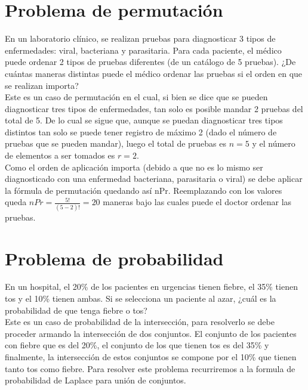 \documentclass[12pt]{article}
\begin{document}
\section{Problema de permutación}

En un laboratorio clínico, se realizan pruebas para diagnosticar 3 tipos de enfermedades: viral, bacteriana y parasitaria. Para cada paciente, el médico puede ordenar 2 tipos de pruebas diferentes (de un catálogo de 5 pruebas). ¿De cuántas maneras distintas puede el médico ordenar las pruebas si el orden en que se realizan importa?\\

Este es un caso de permutación en el cual, si bien se dice que se pueden diagnosticar tres tipos de enfermedades, tan solo es posible mandar 2 pruebas del total de 5. De lo cual se sigue que, aunque se puedan diagnosticar tres tipos distintos tan solo se puede tener registro de máximo 2 (dado el número de pruebas que se pueden mandar), luego el total de pruebas es $n=5$ y el número de elementos a ser tomados es $r=2$.\\

Como el orden de aplicación importa (debido a que no es lo mismo ser diagnosticado con una enfermedad bacteriana, parasitaria o viral) se debe aplicar la fórmula de permutación quedando así nPr. Reemplazando con los valores queda $nPr=\frac{5!}{(5-2)!}= 20$ maneras bajo las cuales puede el doctor ordenar las pruebas.\\

\section{Problema de probabilidad}

En un hospital, el 20\% de los pacientes en urgencias tienen fiebre, el 35\% tienen tos y el 10\% tienen ambas. Si se selecciona un paciente al azar, ¿cuál es la probabilidad de que tenga fiebre o tos?\\

Este es un caso de probabilidad de la intersección, para resolverlo se debe proceder armando la intersección de dos conjuntos. El conjunto de los pacientes con fiebre que es del 20\%, el conjunto de los que tienen tos es del 35\% y finalmente, la intersección de estos conjuntos se compone por el 10\% que tienen tanto tos como fiebre. Para resolver este problema recurriremos a la formula de probabilidad de Laplace para unión de conjuntos.\\
\end{document}
